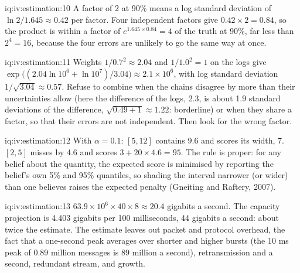 \begin{solution}{iq:iv:estimation:10}
A factor of 2 at 90\% means a log standard deviation of $\ln 2/1.645 \approx 0.42$ per factor. Four independent
factors give $0.42 \times 2 = 0.84$, so the product is within a factor of $e^{1.645 \times 0.84} = 4$ of the truth
at 90\%, far less than $2^4 = 16$, because the four errors are unlikely to go the same way at once.
\end{solution}

\begin{solution}{iq:iv:estimation:11}
Weights $1/0.7^2 \approx 2.04$ and $1/1.0^2 = 1$ on the logs give $\exp\big((2.04 \ln 10^6 + \ln 10^7)/3.04\big)
\approx 2.1 \times 10^6$, with log standard deviation $1/\sqrt{3.04} \approx 0.57$. Refuse to combine when the
chains disagree by more than their uncertainties allow (here the difference of the logs, 2.3, is about 1.9
standard deviations of the difference, $\sqrt{0.49 + 1} \approx 1.22$: borderline) or when they share a factor, so
that their errors are not independent. Then look for the wrong factor.
\end{solution}

\begin{solution}{iq:iv:estimation:12}
With $\alpha = 0.1$: $[5, 12]$ contains 9.6 and scores its width, 7. $[2, 5]$ misses by 4.6 and scores $3 + 20
\times 4.6 = 95$. The rule is proper: for any belief about the quantity, the expected score is minimised by
reporting the belief's own 5\% and 95\% quantiles, so shading the interval narrower (or wider) than one believes
raises the expected penalty (Gneiting and Raftery, 2007).
\end{solution}

\begin{solution}{iq:iv:estimation:13}
$63.9 \times 10^6 \times 40 \times 8 \approx 20.4$ gigabits a second. The capacity projection is 4.403 gigabits
per 100 milliseconds, 44 gigabits a second: about twice the estimate. The estimate leaves out packet and
protocol overhead, the fact that a one-second peak averages over shorter and higher bursts (the 10 ms peak of
0.89 million messages is 89 million a second), retransmission and a second, redundant stream, and growth.
\end{solution}
